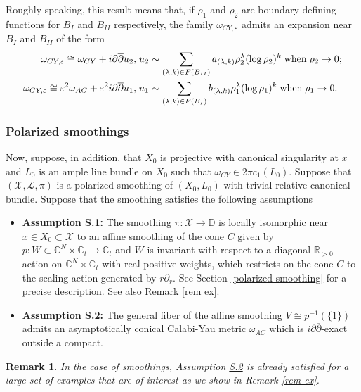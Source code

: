 \documentclass[a4paper,11pt]{article}
\newcounter{mythm}[section]
\newtheorem{rem}[mythm]{Remark}
\def\C{\mathbb{C}}
\def\R{\mathbb{R}}
\begin{document}
Roughly speaking, this result means that, if $\rho_1$ and $\rho_2$ are boundary defining functions for $B_I$ and $B_{II}$ respectively, the family $\omega_{CY, \varepsilon}$ admits an expansion near $B_I$ and $B_{II}$ of the form 
\begin{align*}
     \omega_{CY, \varepsilon} \cong \omega_{CY} + i \partial \overline{\partial} u_2, \hspace{0.1cm} & u_2 \sim \sum_{(\lambda,k) \in F(B_{II})} a_{(\lambda,k)}\rho_2^{\lambda} (\log \rho_2)^k \hspace{0.1cm} \text{when} \hspace{0.1cm} \rho_2 \rightarrow 0;\\
     \omega_{CY, \varepsilon} \cong \varepsilon^2 \omega_{AC} + \varepsilon^2 i \partial \overline{\partial} u_1, \hspace{0.1cm} &u_1 \sim \sum_{(\lambda,k) \in F(B_{I})} b_{(\lambda,k)}\rho_1^{\lambda} (\log \rho_1)^k \hspace{0.1cm} \text{when} \hspace{0.1cm} \rho_1 \rightarrow 0.
\end{align*}
\subsubsection*{Polarized smoothings}
Now, suppose, in addition, that $X_0$ is projective with canonical singularity at $x$ and $L_0$ is an ample line bundle on $X_0$ such that $\omega_{CY} \in 2 \pi c_1(L_0)$. Suppose that $(\mathcal{X}, \mathcal{L}, \pi)$ is a polarized smoothing of $(X_0,L_0)$ with trivial relative canonical bundle. Suppose that the smoothing satisfies the following assumptions 
\begin{itemize}
    \item \textbf{ Assumption \hypertarget{S.1}{S.1}:} The smoothing $\pi :\mathcal{X} \rightarrow \mathbb{D}$ is locally isomorphic near $x \in X_0 \subset \mathcal{X}$ to an affine smoothing of the cone $C$ given by $p:W \subset \C^N \times \C_t \rightarrow \C_t$ and $W$ is invariant with respect to a diagonal $\R_{>0}$-action on $\C^N \times \C_t$ with real positive weights, which restricts on the cone $C$ to the scaling action generated by $r \partial_r$. See Section \ref{polarized smoothing} for a precise description. See also Remark \ref{rem ex}.
    \item \textbf{ Assumption \hypertarget{S.2}{S.2}:} The general fiber of the affine smoothing $V \cong p^{-1}(\{ 1\})$ admits an asymptotically conical Calabi-Yau metric $\omega_{AC}$ which is $i \partial \overline{\partial}$-exact outside a compact. 
\end{itemize}
\begin{rem}
   In the case of smoothings, Assumption \hyperlink{S.2}{S.2} is already satisfied for a large set of examples that are of interest as we show in Remark \ref{rem ex}. 
\end{rem}
\end{document}
